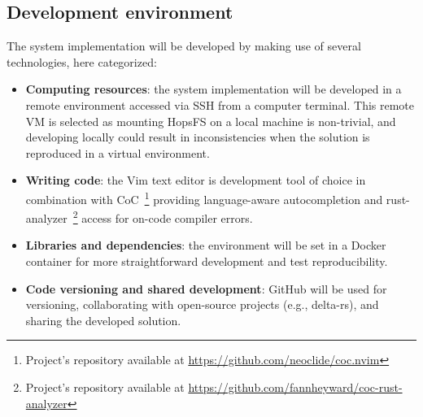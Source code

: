 \subsection{Development environment}
The system implementation will be developed by making use of several technologies, here categorized:
\begin{itemize}
    \item \textbf{Computing resources}: the system implementation will be developed in a remote environment accessed via \gls{SSH} from a computer terminal. This remote \gls{VM} is selected as mounting \gls{HopsFS} on a local machine is non-trivial, and developing locally could result in inconsistencies when the solution is reproduced in a virtual environment.
    \item \textbf{Writing code}: the Vim text editor is development tool of choice in combination with \gls{CoC}~\footnote{Project's repository available at \url{https://github.com/neoclide/coc.nvim}} providing language-aware autocompletion and rust-analyzer~\footnote{Project's repository available at \url{https://github.com/fannheyward/coc-rust-analyzer}} access for on-code compiler errors. 
    \item \textbf{Libraries and dependencies}: the environment will be set in a Docker container for more straightforward development and test reproducibility.
    \item \textbf{Code versioning and shared development}: GitHub will be used for versioning, collaborating with open-source projects (e.g., delta-rs), and sharing the developed solution.
\end{itemize}

 